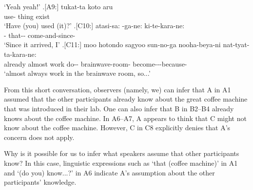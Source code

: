            `Yeah yeah!'
 \bg.[A9:] tukat-ta koto aru \\
        use- thing exist \\
        `Have (you) used (it)?'
 \bg.[C10:] atasi-sa: -ga-ne: ki-te-kara-ne: \\
         - that-- come-and-since- \\
         `Since it arrived, I'
 \bg.[C11:] moo hotondo sagyoo sun-no-ga nooha-beya-ni nat-tyat-ta-kara-ne: \\
           already almost work do-- brainwave-room- become---because- \\
           `almost always work in the brainwave room, so...'

From this short conversation,
observers (namely, we) can infer that
A in A1 assumed that the other participants already know about the great coffee machine that was introduced in their lab.
One can also infer that B in B2--B4 already knows about the coffee machine.
In A6--A7,
A appears to think that C might not know about the coffee machine.
However, C in C8 explicitly denies that A's concern does not apply.

Why is it possible for us to infer what speakers assume that other participants know?
In this case, linguistic expressions such as
 `that (coffee machine)' in A1 and
 `(do you) know...?' in A6
indicate A's assumption about the other participants' knowledge.

